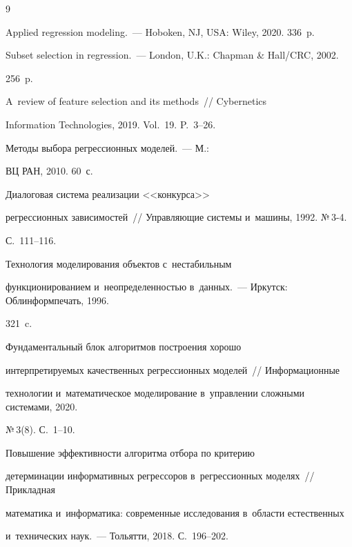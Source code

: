 {\small\frenchspacing


{%




\begin{thebibliography}{9}




 Applied regression modeling.~--- Hoboken, NJ, USA: Wiley, 2020. 336~p.




 Subset selection in regression.~--- London, U.K.: Chapman \& Hall/CRC, 2002. 


256~p.




 A~review of feature selection and its methods~/\!\!/ Cybernetics 


Information Technologies, 2019. Vol.~19. P.~3--26.




 Методы выбора регрессионных моделей.~--- М.:  


ВЦ РАН, 2010. 60~с.







 Диалоговая система реализации <<конкурса>> 


регрессионных зависимостей~/\!\!/ Управ\-ля\-ющие сис\-те\-мы и~машины, 1992. №\,3-4. 


С.~111--116.




 Технология моделирования объектов с~нестабильным 


функционированием и~неопределенностью в~данных.~--- Иркутск: Облинформпечать, 1996. 


321~c.







 Фундаментальный блок алгоритмов построения хорошо 


интерпретируемых качественных регрессионных моделей~/\!\!/ Информационные 


технологии и~математическое моделирование в~управлении сложными системами, 2020. 


 №\,3(8). С.~1--10.




 Повышение эффективности алгоритма отбора по критерию 


детерминации информативных регрессоров в~регрессионных моделях~/\!\!/ Прикладная 


математика и~информатика: современные исследования в~области естественных 


и~технических наук.~--- Тольятти, 2018. С.~196--202.





    \end{thebibliography}


} }
